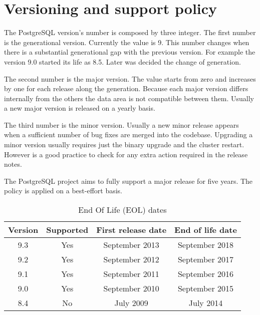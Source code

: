\chapter{Versioning and support policy}
The PostgreSQL version's number is composed by three integer. The first number is the generational
version. Currently the value is 9. This number changes when there is a substantial generational gap
with the previous version. For example the version 9.0 started its life as 8.5. Later was decided
the change of generation.\newline

The second number is the major version. The value starts from zero and increases by one for each
release along the generation. Because each major version differs internally from the others the data
area is not compatible between them. Usually a new major version is released on a yearly
basis.\newline

The third number is the minor version. Usually a new minor release appears when a sufficient number
of bug fixes are merged into the codebase. Upgrading a minor version usually requires just the
binary upgrade and the cluster restart. However is a good practice to check for any extra action
required in the release notes.\newline

The PostgreSQL project aims to fully support a major release for five years.  The policy is
applied on a best-effort basis. 

\begin{table}[H]
  \begin{tabular}{cccc}
    Version & Supported & First release date & End of life date \\ 
    \hline
    9.3 & Yes &September 2013 & September 2018\\
    9.2 & Yes & September 2012 & September 2017\\
    9.1 & Yes & September 2011 & September 2016\\
    9.0 & Yes & September 2010 & September 2015\\
    8.4 & No & July 2009 & July 2014\\
    
  \end{tabular}
  \caption{\label{tab:EOLDATES}End Of Life (EOL) dates}
\end{table}